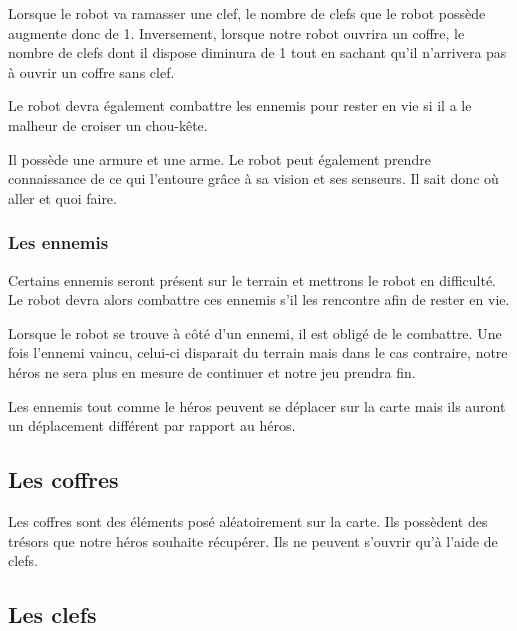 \documentclass[a4paper 12pts]{article}
\begin{document}
Lorsque le robot va ramasser une clef, le nombre de clefs que le robot possède augmente donc de 1.
Inversement, lorsque notre robot ouvrira un coffre, le nombre de clefs dont il dispose diminura de 1 tout en sachant qu'il n'arrivera pas à ouvrir un coffre sans clef.

Le robot devra également combattre les ennemis pour rester en vie si il a le malheur de croiser un chou-kête.

Il possède une armure et une arme.
Le robot peut également prendre connaissance de ce qui l'entoure grâce à sa vision et ses senseurs. Il sait donc où aller et quoi faire.

\vspace{0.75cm}

\subsubsection{Les ennemis}


\vspace{0.75cm}


Certains ennemis seront présent sur le terrain et mettrons le robot en difficulté. 
Le robot devra alors combattre ces ennemis s'il les rencontre afin de rester en vie.

Lorsque le robot se trouve à côté d'un ennemi, il est obligé de le combattre. 
Une fois l'ennemi vaincu, celui-ci disparait du terrain mais dans le cas contraire, notre héros ne sera plus en mesure de continuer et notre jeu prendra fin.

Les ennemis tout comme le héros peuvent se déplacer sur la carte mais ils auront un déplacement différent par rapport au héros.



\newpage
\subsection{Les coffres}


\vspace{0.75cm}

Les coffres sont des éléments posé aléatoirement sur la carte. Ils possèdent des trésors que notre héros souhaite récupérer.
Ils ne peuvent s'ouvrir qu'à l'aide de clefs.


\vspace{0.75cm}

\subsection{Les clefs}
\end{document}
